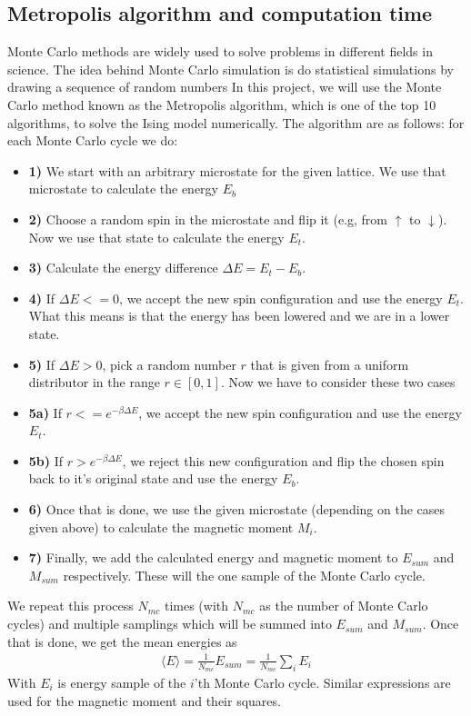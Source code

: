 \documentclass[12pt]{article}
\begin{document}
\subsection{Metropolis algorithm and computation time}
Monte Carlo methods are widely used to solve problems in different fields in science. The idea behind Monte Carlo simulation is do statistical simulations by drawing a sequence of random numbers In this project, we will use the Monte Carlo method known as the Metropolis algorithm, which is one of the top 10 algorithms, to solve the Ising model numerically.
The algorithm are as follows: for each Monte Carlo cycle we do:
\begin{itemize}
\item \textbf{1)} We start with an arbitrary microstate for the given lattice. We use that microstate to calculate the energy $E_b$
\item \textbf{2)} Choose a random spin in the microstate and flip it (e.g, from $\uparrow$ to $\downarrow$). Now we use that state to calculate the energy $E_t$.
\item \textbf{3)} Calculate the energy difference $\Delta E = E_t - E_b$. 
\item \textbf{4)} If $\Delta E <= 0$, we accept the new spin configuration and use the energy $E_t$. What this means is that the energy has been lowered and we are in a lower state.
\item \textbf{5)} If $ \Delta E > 0$, pick a random number $r$ that is given from a uniform distributor in the range $r \in [0,1]$. Now we have to consider these two cases
\item \textbf{5a)} If $r <= e^{-\beta \Delta E}$, we accept the new spin configuration and use the energy $E_t$.
\item \textbf{5b)} If $ r > e^{-\beta \Delta E}$, we reject this new configuration and flip the chosen spin back to it's original state and use the energy $E_b$.
\item \textbf{6)} Once that is done, we use the given microstate (depending on the cases given above) to calculate the magnetic moment $M_i$.
\item \textbf{7)} Finally, we add the calculated energy and magnetic moment to $E_{sum}$ and $M_{sum}$ respectively. These will the one sample of the Monte Carlo cycle.
\end{itemize}
We repeat this process $N_{mc}$ times (with $N_{mc}$ as the number of Monte Carlo cycles) and multiple samplings which will be summed into $E_{sum}$ and $M_{sum}$. Once that is done, we get the mean energies as
\begin{align*}
\langle E \rangle = \frac{1}{N_{mc}}E_{sum} = \frac{1}{N_{mc}}\displaystyle \sum_i E_i
\end{align*}
With $E_i$ is energy sample of the $i$'th Monte Carlo cycle. Similar expressions are used for the magnetic moment and their squares.
\end{document}
